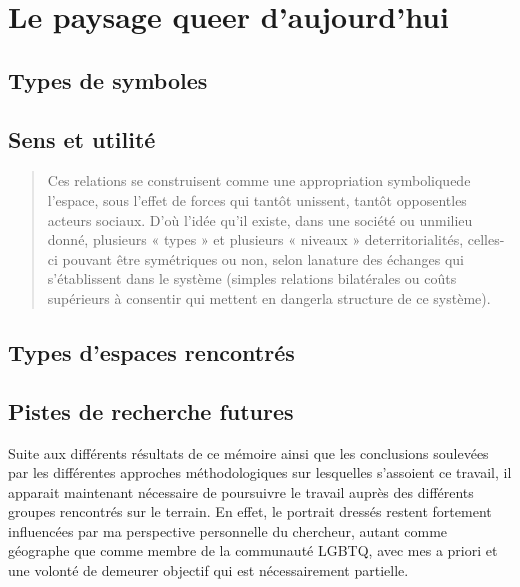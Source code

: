 
\chapter{Le paysage queer d'aujourd'hui}
\label{cha:le_paysage_queer_d_aujourd_hui}

\section{Types de symboles}
\label{sec:types_de_symboles}


\section{Sens et utilité}
\label{sec:sens_et_utilit_}
\begin{quotation}
Ces relations se construisent comme une appropriation symboliquede l'espace, sous l'effet de forces qui tantôt unissent, tantôt opposentles acteurs sociaux. 
D'où l'idée qu'il existe, dans une société ou unmilieu donné, plusieurs « types » et plusieurs « niveaux » deterritorialités, celles-ci pouvant être symétriques ou non, selon lanature des échanges qui s'établissent dans le système (simples relations bilatérales ou coûts supérieurs à consentir qui mettent en dangerla structure de ce système).\citep[41]{Courville1991}
\end{quotation}

\section{Types d'espaces rencontrés}
\label{sec:types_d_espaces_rencontr_s}


\section{Pistes de recherche futures}
\label{sec:pistes_de_recherches}

Suite aux différents résultats de ce mémoire ainsi que les conclusions soulevées par les différentes approches méthodologiques sur lesquelles s'assoient ce travail, il apparait maintenant nécessaire de poursuivre le travail auprès des différents groupes rencontrés sur le terrain.
En effet, le portrait dressés restent fortement influencées par ma perspective personnelle du chercheur, autant comme géographe que comme membre de la communauté LGBTQ, avec mes a priori et une volonté de demeurer objectif qui est nécessairement partielle.

